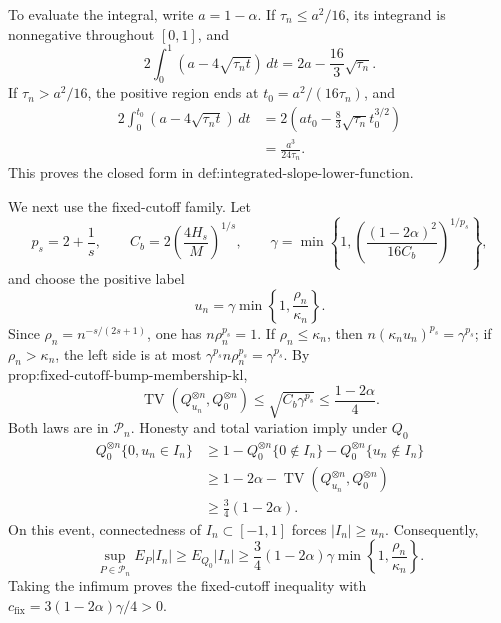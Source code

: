 To evaluate the integral, write \(a=1-\alpha\).  If
\(\tau_n\le a^2/16\), its integrand is nonnegative throughout
\([0,1]\), and
\[
 2\int_0^1(a-4\sqrt{\tau_nt})\,dt
 =2a-\frac{16}{3}\sqrt{\tau_n}.
\]
If \(\tau_n>a^2/16\), the positive region ends at
\(t_0=a^2/(16\tau_n)\), and
\[
 \begin{aligned}
 2\int_0^{t_0}(a-4\sqrt{\tau_nt})\,dt
 &=2\left(at_0-\frac83\sqrt{\tau_n}t_0^{3/2}\right)\\
 &=\frac{a^3}{24\tau_n}.
 \end{aligned}
\]
This proves the closed form in
\(\text{def:integrated-slope-lower-function}\).

We next use the fixed-cutoff family.  Let
\[
 p_s=2+\frac1s,
 \qquad
 C_b=2\left(\frac{4H_s}{M}\right)^{1/s},
 \qquad
 \gamma=\min\left\{1,
 \left(\frac{(1-2\alpha)^2}{16C_b}\right)^{1/p_s}\right\},
\]
and choose the positive label
\[
 u_n=\gamma\min\left\{1,\frac{\rho_n}{\kappa_n}\right\}.
\]
Since \(\rho_n=n^{-s/(2s+1)}\), one has
\(n\rho_n^{p_s}=1\).  If \(\rho_n\le\kappa_n\), then
\(n(\kappa_nu_n)^{p_s}=\gamma^{p_s}\); if
\(\rho_n>\kappa_n\), the left side is at most
\(\gamma^{p_s}n\rho_n^{p_s}=\gamma^{p_s}\).  By
\(\text{prop:fixed-cutoff-bump-membership-kl}\),
\[
 \operatorname{TV}(Q_{u_n}^{\otimes n},Q_0^{\otimes n})
 \le\sqrt{C_b\gamma^{p_s}}
 \le\frac{1-2\alpha}{4}.
\]
Both laws are in \(\mathcal P_n\).  Honesty and total variation imply
under \(Q_0\)
\[
 \begin{aligned}
 Q_0^{\otimes n}\{0,u_n\in I_n\}
 &\ge1-Q_0^{\otimes n}\{0\notin I_n\}
       -Q_0^{\otimes n}\{u_n\notin I_n\}\\
 &\ge1-2\alpha-
 \operatorname{TV}(Q_{u_n}^{\otimes n},Q_0^{\otimes n})\\
 &\ge\frac34(1-2\alpha).
 \end{aligned}
\]
On this event, connectedness of \(I_n\subset[-1,1]\) forces
\(|I_n|\ge u_n\).  Consequently,
\[
 \sup_{P\in\mathcal P_n}E_P|I_n|
 \ge E_{Q_0}|I_n|
 \ge \frac34(1-2\alpha)\gamma
       \min\left\{1,\frac{\rho_n}{\kappa_n}\right\}.
\]
Taking the infimum proves the fixed-cutoff inequality with
\(c_{\mathrm{fix}}=3(1-2\alpha)\gamma/4>0\).

